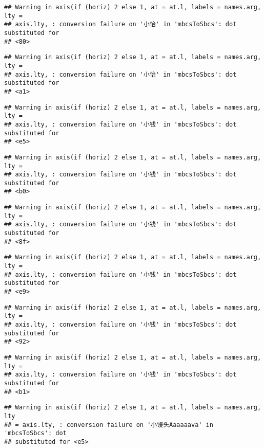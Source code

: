 \documentclass[
]{article}
\begin{document}
\begin{verbatim}
## Warning in axis(if (horiz) 2 else 1, at = at.l, labels = names.arg, lty =
## axis.lty, : conversion failure on '小怡' in 'mbcsToSbcs': dot substituted for
## <80>
\end{verbatim}

\begin{verbatim}
## Warning in axis(if (horiz) 2 else 1, at = at.l, labels = names.arg, lty =
## axis.lty, : conversion failure on '小怡' in 'mbcsToSbcs': dot substituted for
## <a1>
\end{verbatim}

\begin{verbatim}
## Warning in axis(if (horiz) 2 else 1, at = at.l, labels = names.arg, lty =
## axis.lty, : conversion failure on '小钱' in 'mbcsToSbcs': dot substituted for
## <e5>
\end{verbatim}

\begin{verbatim}
## Warning in axis(if (horiz) 2 else 1, at = at.l, labels = names.arg, lty =
## axis.lty, : conversion failure on '小钱' in 'mbcsToSbcs': dot substituted for
## <b0>
\end{verbatim}

\begin{verbatim}
## Warning in axis(if (horiz) 2 else 1, at = at.l, labels = names.arg, lty =
## axis.lty, : conversion failure on '小钱' in 'mbcsToSbcs': dot substituted for
## <8f>
\end{verbatim}

\begin{verbatim}
## Warning in axis(if (horiz) 2 else 1, at = at.l, labels = names.arg, lty =
## axis.lty, : conversion failure on '小钱' in 'mbcsToSbcs': dot substituted for
## <e9>
\end{verbatim}

\begin{verbatim}
## Warning in axis(if (horiz) 2 else 1, at = at.l, labels = names.arg, lty =
## axis.lty, : conversion failure on '小钱' in 'mbcsToSbcs': dot substituted for
## <92>
\end{verbatim}

\begin{verbatim}
## Warning in axis(if (horiz) 2 else 1, at = at.l, labels = names.arg, lty =
## axis.lty, : conversion failure on '小钱' in 'mbcsToSbcs': dot substituted for
## <b1>
\end{verbatim}

\begin{verbatim}
## Warning in axis(if (horiz) 2 else 1, at = at.l, labels = names.arg, lty
## = axis.lty, : conversion failure on '小馒头Aaaaaava' in 'mbcsToSbcs': dot
## substituted for <e5>
\end{verbatim}
\end{document}
